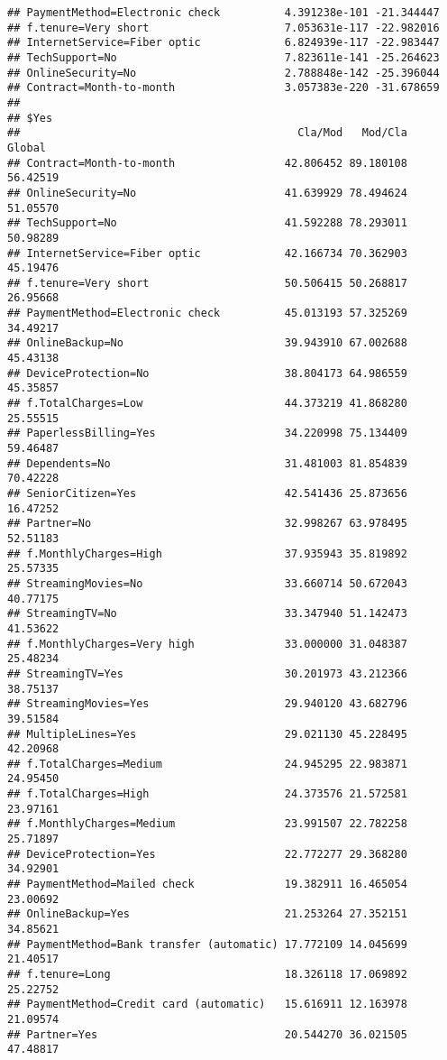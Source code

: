 \documentclass[
  a4paper]{article}
\begin{document}
\begin{verbatim}
## PaymentMethod=Electronic check          4.391238e-101 -21.344447
## f.tenure=Very short                     7.053631e-117 -22.982016
## InternetService=Fiber optic             6.824939e-117 -22.983447
## TechSupport=No                          7.823611e-141 -25.264623
## OnlineSecurity=No                       2.788848e-142 -25.396044
## Contract=Month-to-month                 3.057383e-220 -31.678659
## 
## $Yes
##                                           Cla/Mod   Mod/Cla   Global
## Contract=Month-to-month                 42.806452 89.180108 56.42519
## OnlineSecurity=No                       41.639929 78.494624 51.05570
## TechSupport=No                          41.592288 78.293011 50.98289
## InternetService=Fiber optic             42.166734 70.362903 45.19476
## f.tenure=Very short                     50.506415 50.268817 26.95668
## PaymentMethod=Electronic check          45.013193 57.325269 34.49217
## OnlineBackup=No                         39.943910 67.002688 45.43138
## DeviceProtection=No                     38.804173 64.986559 45.35857
## f.TotalCharges=Low                      44.373219 41.868280 25.55515
## PaperlessBilling=Yes                    34.220998 75.134409 59.46487
## Dependents=No                           31.481003 81.854839 70.42228
## SeniorCitizen=Yes                       42.541436 25.873656 16.47252
## Partner=No                              32.998267 63.978495 52.51183
## f.MonthlyCharges=High                   37.935943 35.819892 25.57335
## StreamingMovies=No                      33.660714 50.672043 40.77175
## StreamingTV=No                          33.347940 51.142473 41.53622
## f.MonthlyCharges=Very high              33.000000 31.048387 25.48234
## StreamingTV=Yes                         30.201973 43.212366 38.75137
## StreamingMovies=Yes                     29.940120 43.682796 39.51584
## MultipleLines=Yes                       29.021130 45.228495 42.20968
## f.TotalCharges=Medium                   24.945295 22.983871 24.95450
## f.TotalCharges=High                     24.373576 21.572581 23.97161
## f.MonthlyCharges=Medium                 23.991507 22.782258 25.71897
## DeviceProtection=Yes                    22.772277 29.368280 34.92901
## PaymentMethod=Mailed check              19.382911 16.465054 23.00692
## OnlineBackup=Yes                        21.253264 27.352151 34.85621
## PaymentMethod=Bank transfer (automatic) 17.772109 14.045699 21.40517
## f.tenure=Long                           18.326118 17.069892 25.22752
## PaymentMethod=Credit card (automatic)   15.616911 12.163978 21.09574
## Partner=Yes                             20.544270 36.021505 47.48817

\end{verbatim}
\end{document}
